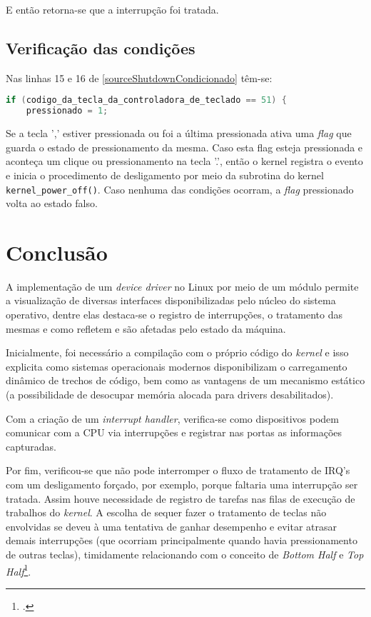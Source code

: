 \documentclass[
	12pt,			
	openright,			%
	twoside,			%
	a4paper,			%
	english,			%
	brazil,				%
	]{abntex2}
\begin{document}
E então retorna-se que a interrupção foi tratada.

\section{Verificação das condições}

Nas linhas 15 e 16 de \autoref{sourceShutdownCondicionado} têm-se:

\begin{lstlisting}[language=C]
  if (codigo_da_tecla_da_controladora_de_teclado == 51) {
    pressionado = 1;
\end{lstlisting}

Se a tecla ',' estiver pressionada ou foi a última pressionada ativa uma
\emph{flag} que guarda o estado de pressionamento da mesma. Caso esta flag
esteja pressionada e aconteça um clique ou pressionamento na tecla '.', então o
kernel registra o evento e inicia o procedimento de desligamento por meio da
subrotina do kernel \lstinline{kernel_power_off()}. Caso nenhuma
das condições ocorram, a \emph{flag} pressionado volta ao estado falso.

\chapter{Conclusão}

A implementação de um \emph{device driver} no Linux por meio de um módulo
permite a visualização de diversas interfaces disponibilizadas pelo núcleo do
sistema operativo, dentre elas destaca-se o registro de interrupções, o
tratamento das mesmas e como refletem e são afetadas pelo estado da máquina.

Inicialmente, foi necessário a compilação com o próprio código do \emph{kernel}
e isso explicita como sistemas operacionais modernos disponibilizam o
carregamento dinâmico de trechos de código, bem como as vantagens de um
mecanismo estático (a possibilidade de desocupar memória alocada para drivers
desabilitados).

Com a criação de um \emph{interrupt handler}, verifica-se como dispositivos
podem comunicar com a CPU via interrupções e registrar nas portas as informações
capturadas.

Por fim, verificou-se que não pode interromper o fluxo de tratamento de IRQ's
com um desligamento forçado, por exemplo, porque faltaria uma interrupção ser
tratada. Assim houve necessidade de registro de tarefas nas filas de execução 
de trabalhos do \emph{kernel}. A escolha de sequer fazer o tratamento de teclas
não envolvidas se deveu à uma tentativa de ganhar desempenho e evitar atrasar
demais interrupções (que ocorriam principalmente quando havia pressionamento de
outras teclas), timidamente relacionando com o conceito de \emph{Bottom Half} e
\emph{Top Half}\footcite{topbottomhalves}.
\end{document}
